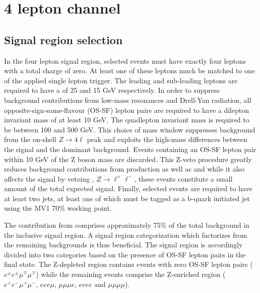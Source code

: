 \clearpage
\section{4 lepton channel}
\label{sec:4lep}

\subsection{Signal region selection}
In the four lepton signal region, selected events must have exactly four leptons with a total charge of zero. 
At least one of these leptons much be matched to one of the applied single lepton trigger. 
The leading and sub-leading leptons are required to have a \pt of 25 and 15 GeV respectively. 
In order to suppress background contributions from low-mass resonances and Drell-Yan radiation, all opposite-sign-same-flavour (OS-SF) lepton pairs are required to have a dilepton invariant mass of at least 10 GeV. 
The quadlepton invariant mass is required to be between 100 and 500 GeV. 
This choice of mass window suppresses background from the on-shell $Z\to4\ell$ peak and exploits the high-mass differences between the signal and the dominant \ttZ background. 
Events containing an OS-SF lepton pair within 10 GeV of the Z boson mass are discarded. 
This Z-veto procedure greatly reduces background contributions from \ZZ production as well as \ttZ and while it also affects the signal by vetoing \hzzstar, $Z\to\ell^+\ell^-$, these events constitute a small amount of the total expected signal. 
Finally, selected events are required to have at least two jets, at least one of which must be tagged as a b-quark initiated jet using the MV1 70\% working point. 

The contribution from \ttZ comprises approximately 75\% of the total background in the inclusive signal region. 
A signal region categorization which factorizes \ttZ from the remaining backgrounds is thus beneficial. 
The signal region is accordingly divided into two categories based on the presence of OS-SF lepton pairs in the final state. 
The Z-depleted region contains events with zero OS-SF lepton pairs ($e^\pm e^\pm \mu^\mp\mu^\mp$) while the remaining events comprise the Z-enriched region ($e^+e^-\mu^+\mu^-$, $eee\mu$, $\mu\mu\mu e$, $eeee$ and $\mu\mu\mu\mu$). 

